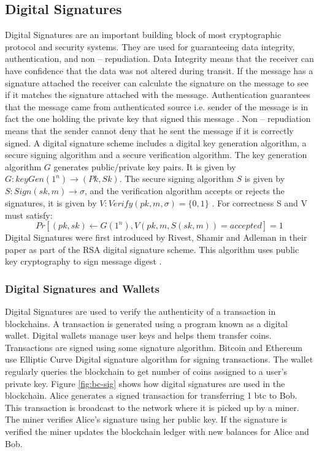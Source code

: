 \subsection{Digital Signatures}
Digital Signatures are an important building block of most cryptographic protocol and security systems. They are used for guaranteeing data integrity, authentication, and non – repudiation. Data Integrity means that the receiver can have confidence that the data was not altered during transit. If the message has a signature attached the receiver can calculate the signature on the message to see if it matches the signature attached with the message. Authentication guarantees that the message came from authenticated source i.e. sender of the message is in fact the one holding the private key that signed this message \cite{Rivest:1978:MOD:359340.359342}. Non – repudiation means that the sender cannot deny that he sent the message if it is correctly signed. A digital signature scheme includes a digital key generation algorithm, a secure signing algorithm and a secure verification algorithm. The key generation algorithm $G$ generates public/private key pairs. It is given by $G:keyGen(1^n) \rightarrow (Pk,Sk)$. The secure signing algorithm $S$ is given by $S:Sign(sk,m) \rightarrow \sigma$, and the verification algorithm accepts or rejects the signatures, it is given by $V:Verify(pk,m,\sigma)=\{0,1\}$ \cite{Lysyanskaya:2002:SSA:936405}.  For correctness S and V must satisfy:
 \begin{equation}
  Pr [ (pk, sk) \leftarrow G(1^n), V( pk, m, S(sk, m) ) = accepted ] = 1 
 \end{equation}
Digital Signatures were first introduced by Rivest, Shamir and Adleman in their paper \cite{Rivest:1978:MOD:359340.359342} as part of the RSA digital signature scheme. This algorithm uses public key cryptography to sign message digest \cite{Rivest:1978:MOD:359340.359342}. 
\vspace{0.3cm}
\subsubsection{Digital Signatures and Wallets}
Digital Signatures are used to verify the authenticity of a transaction in blockchains. A transaction is generated using a program known as  a digital wallet. Digital wallets manage user keys and helps them transfer coins. Transactions are signed using some signature algorithm. Bitcoin and Ethereum use Elliptic Curve Digital signature algorithm for signing transactions. The wallet regularly queries the blockchain to get number of coins assigned to a user's private key. Figure \ref{fig:bc-sig} shows how digital signatures are used in the blockchain. Alice generates a signed transaction for transferring 1 btc to Bob. This transaction is broadcast to the network where it is picked up by a miner. The miner verifies Alice’s signature using her public key. If the signature is verified the miner updates the blockchain ledger with new balances for Alice and Bob.

